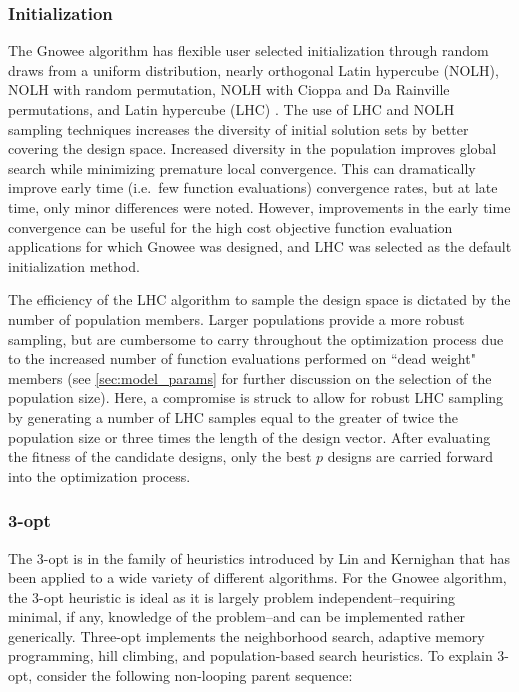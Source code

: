 \documentclass{article}                                                                           %
\begin{document}
\subsubsection{Initialization}
The Gnowee algorithm has flexible user selected initialization through random draws from a uniform distribution, nearly orthogonal Latin hypercube (NOLH), NOLH with random permutation, NOLH with Cioppa and Da Rainville permutations, and Latin hypercube (LHC) \cite{Viana2013, Cioppa2007, Rainville2012}.
The use of LHC and NOLH sampling techniques increases the diversity of initial solution sets by better covering the design space.
Increased diversity in the population improves global search while minimizing premature local convergence.
This can dramatically improve early time (i.e.\ few function evaluations) convergence rates, but at late time, only minor differences were noted.
However, improvements in the early time convergence can be useful for the high cost objective function evaluation applications for which Gnowee was designed, and LHC was selected as the default initialization method.

The efficiency of the LHC algorithm to sample the design space is dictated by the number of population members.
Larger populations provide a more robust sampling, but are cumbersome to carry throughout the optimization process due to the increased number of function evaluations performed on ``dead weight" members (see \autoref{sec:model_params} for further discussion on the selection of the population size).
Here, a compromise is struck to allow for robust LHC sampling by generating a number of LHC samples equal to the greater of twice the population size or three times the length of the design vector.
After evaluating the fitness of the candidate designs, only the best $p$ designs are carried forward into the optimization process. 
 
\subsubsection{3-opt}
The 3-opt is in the family of heuristics introduced by Lin and Kernighan that has been applied to a wide variety of different algorithms\cite{Lin1973}.
For the Gnowee algorithm, the 3-opt heuristic is ideal as it is largely problem independent--requiring minimal, if any, knowledge of the problem--and can be implemented rather generically.  
Three-opt implements the neighborhood search, adaptive memory programming, hill climbing, and population-based search heuristics.
To explain 3-opt, consider the following non-looping parent sequence:
\end{document}
